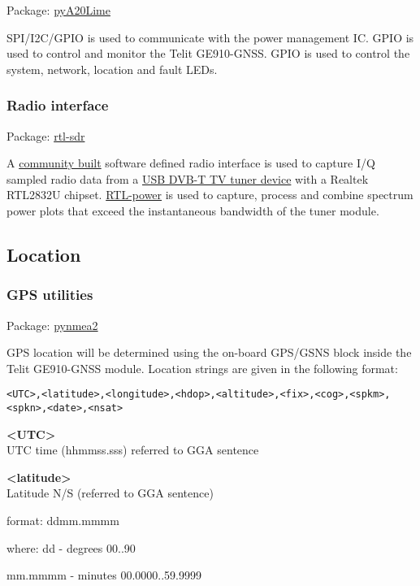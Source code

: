 Package:	\href{https://pypi.python.org/pypi/pyA20Lime}{pyA20Lime}

SPI/I2C/GPIO is used to communicate with the power management IC. GPIO is used to control and monitor the Telit GE910-GNSS. GPIO is used to control the system, network, location and fault LEDs.
    
\subsubsection{Radio interface}
	
Package:	\href{http://sdr.osmocom.org/trac/wiki/rtl-sdr}{rtl-sdr}

A \href{http://sdr.osmocom.org/trac/wiki/rtl-sdr#Buildingthesoftware}{community built} software defined radio interface is used to capture I/Q sampled radio data from a \href{http://www.rtl-sdr.com/buy-rtl-sdr-dvb-t-dongles/}{ USB DVB-T TV tuner device} with a Realtek RTL2832U chipset. \href{http://kmkeen.com/rtl-power/}{RTL-power} is used to capture, process and combine spectrum power plots that exceed the instantaneous bandwidth of the tuner module.

\subsection{Location}

\subsubsection{GPS utilities}

Package:	\href{https://github.com/Knio/pynmea2}{pynmea2}

GPS location will be determined using the on-board GPS/GSNS block inside the Telit GE910-GNSS module. Location strings are given in the following format:
\begin{lstlisting}
<UTC>,<latitude>,<longitude>,<hdop>,<altitude>,<fix>,<cog>,<spkm>,<spkn>,<date>,<nsat>
\end{lstlisting}

\textbf{<UTC>} \\
UTC time (hhmmss.sss) referred to GGA sentence

\textbf{<latitude>} \\
Latitude N/S (referred to GGA sentence)
	
format:
ddmm.mmmm
					
where:
dd - degrees
00..90

mm.mmmm - minutes
00.0000..59.9999

